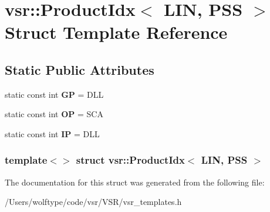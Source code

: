 \hypertarget{structvsr_1_1_product_idx_3_01_l_i_n_00_01_p_s_s_01_4}{\section{vsr\-:\-:Product\-Idx$<$ L\-I\-N, P\-S\-S $>$ Struct Template Reference}
\label{structvsr_1_1_product_idx_3_01_l_i_n_00_01_p_s_s_01_4}
}
\subsection*{Static Public Attributes}
\begin{DoxyCompactItemize}
\item 
\hypertarget{structvsr_1_1_product_idx_3_01_l_i_n_00_01_p_s_s_01_4_ac547e5e6721e46476817497dc994a2c0}{static const int {\bfseries G\-P} = D\-L\-L}\label{structvsr_1_1_product_idx_3_01_l_i_n_00_01_p_s_s_01_4_ac547e5e6721e46476817497dc994a2c0}

\item 
\hypertarget{structvsr_1_1_product_idx_3_01_l_i_n_00_01_p_s_s_01_4_aafe0fe2cd14fba1b4c880922d0119067}{static const int {\bfseries O\-P} = S\-C\-A}\label{structvsr_1_1_product_idx_3_01_l_i_n_00_01_p_s_s_01_4_aafe0fe2cd14fba1b4c880922d0119067}

\item 
\hypertarget{structvsr_1_1_product_idx_3_01_l_i_n_00_01_p_s_s_01_4_af69346029ce3b76c00a7c938e670dc8e}{static const int {\bfseries I\-P} = D\-L\-L}\label{structvsr_1_1_product_idx_3_01_l_i_n_00_01_p_s_s_01_4_af69346029ce3b76c00a7c938e670dc8e}

\end{DoxyCompactItemize}
\subsubsection*{template$<$$>$ struct vsr\-::\-Product\-Idx$<$ L\-I\-N, P\-S\-S $>$}



The documentation for this struct was generated from the following file\-:\begin{DoxyCompactItemize}
\item 
/\-Users/wolftype/code/vsr/\-V\-S\-R/vsr\-\_\-templates.\-h\end{DoxyCompactItemize}
